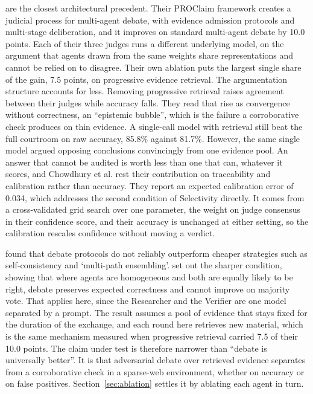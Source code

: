 \citet{chowdhury2026} are the closest architectural precedent. Their PROClaim framework creates a judicial process for multi-agent debate, with evidence admission protocols and multi-stage deliberation, and it improves on standard multi-agent debate by 10.0 points. Each of their three judges runs a different underlying model, on the argument that agents drawn from the same weights share representations and cannot be relied on to disagree. Their own ablation puts the largest single share of the gain, 7.5 points, on progressive evidence retrieval. The argumentation structure accounts for less. Removing progressive retrieval raises agreement between their judges while accuracy falls. They read that rise as convergence without correctness, an ``epistemic bubble'', which is the failure a corroborative check produces on thin evidence. A single-call model with retrieval still beat the full courtroom on raw accuracy, 85.8\% against 81.7\%. However, the same single model argued opposing conclusions convincingly from one evidence pool. An answer that cannot be audited is worth less than one that can, whatever it scores, and Chowdhury et al. rest their contribution on traceability and calibration rather than accuracy. They report an expected calibration error of 0.034, which addresses the second condition of Selectivity directly. It comes from a cross-validated grid search over one parameter, the weight on judge consensus in their confidence score, and their accuracy is unchanged at either setting, so the calibration rescales confidence without moving a verdict.

\citet{smit2024} found that debate protocols do not reliably outperform cheaper strategies such as self-consistency and `multi-path ensembling'. \citet{zhu2026} set out the sharper condition, showing that where agents are homogeneous and both are equally likely to be right, debate preserves expected correctness and cannot improve on majority vote. That applies here, since the Researcher and the Verifier are one model separated by a prompt. The result assumes a pool of evidence that stays fixed for the duration of the exchange, and each round here retrieves new material, which is the same mechanism \citet{chowdhury2026} measured when progressive retrieval carried 7.5 of their 10.0 points. The claim under test is therefore narrower than ``debate is universally better''. It is that adversarial debate over retrieved evidence separates from a corroborative check in a sparse-web environment, whether on accuracy or on false positives. Section~\ref{sec:ablation} settles it by ablating each agent in turn.

